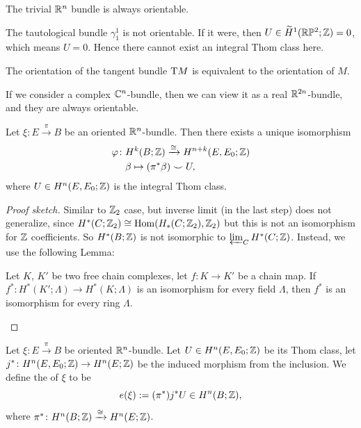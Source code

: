 \begin{example}
The trivial $\mathbb{R}^{n}$ bundle is always orientable.
\end{example}

\begin{non-example}
The tautological bundle $\gamma^{1}_{1}$ is not orientable. If it
were, then $U\in\widetilde{H}^{1}(\mathbb{R}\mathbb{P}^{2};\mathbb{Z})=0$, which means
$U=0$. Hence there cannot exist an integral Thom class here.
\end{non-example}

\begin{remark}
The orientation of the tangent bundle $\mathrm{T} M$ is equivalent to the
orientation of $M$.
\end{remark}

\begin{remark}
If we consider a complex $\mathbb{C}^{n}$-bundle, then we can view it as a
real $\mathbb{R}^{2n}$-bundle, and they are always orientable.
\end{remark}


\begin{theorem}
Let $\xi\colon E\xrightarrow{\pi}B$ be an oriented $\mathbb{R}^{n}$-bundle.
Then there exists a unique isomorphism
\begin{align}
\varphi\colon & H^{k}(B;\mathbb{Z})\xrightarrow{\cong}H^{n+k}(E,E_{0};\mathbb{Z})\\
& \beta\mapsto(\pi^{*}\beta)\smile U\nonumber,
\end{align}
where $U\in H^{n}(E,E_{0};\mathbb{Z})$ is the integral Thom class.
\end{theorem}

\begin{proof}[Proof sketch]
Similar to $\mathbb{Z}_{2}$ case, but inverse limit (in the last step) does
not generalize, since $H^{*}(C;\mathbb{Z}_{2})\cong\operatorname{Hom}(H_{*}(C;\mathbb{Z}_{2}),\mathbb{Z}_{2})$
but this is not an isomorphism for $\mathbb{Z}$ coefficients. So
$H^{*}(B;\mathbb{Z})$ is not isomorphic to
$\varprojlim_{C}H^{*}(C;\mathbb{Z})$. Instead, we use the following Lemma:
\begin{lemma}
Let $K$, $K'$ be two free chain complexes, let $f\colon K\to K'$ be a
chain map. If $f^{*}\colon H^{*}(K';\Lambda)\to H^{*}(K;\Lambda)$ is
an isomorphism for every field $\Lambda$, then $f^{*}$ is an
isomorphism for every ring $\Lambda$.\qedhere
\end{lemma}
\end{proof}

\begin{definition}
Let $\xi\colon E\xrightarrow{\pi}B$ be oriented $\mathbb{R}^{n}$-bundle.
Let $U\in H^{n}(E,E_{0};\mathbb{Z})$ be its Thom class, let $j^{*}\colon H^{n}(E,E_{0};\mathbb{Z})\to H^{n}(E;\mathbb{Z})$
be the induced morphism from the inclusion. We define the
 of $\xi$ to be
\begin{equation}
e(\xi):=(\pi^{*})j^{*}U\in H^{n}(B;\mathbb{Z}),
\end{equation}
where $\pi^{*}\colon H^{n}(B;\mathbb{Z})\xrightarrow{\cong}H^{n}(E;\mathbb{Z})$.
\end{definition}

